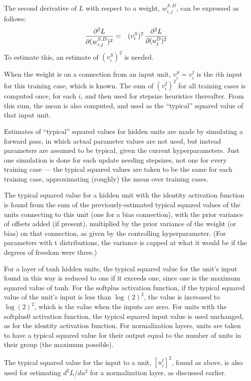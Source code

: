 \documentclass{report}[11pt]
\def\beq{\begin{eqnarray}}
\def\eeq{\end{eqnarray}}
\begin{document}
The second derivative of $L$ with respect to a weight, $w^{S,D}_{i,j}$,
can be expressed as follows:\beq
  {\partial^2 L \over \partial (w^{S,D}_{i,j})^2} & = &
    (v^S_i)^2\,{\partial^2 L \over \partial (u^D_j)^2}
\eeq%
To estimate this, an estimate of $(v^S_i)^2$ is needed.

When the weight is on a connection from an input unit, $v^S_i = v^I_i$
is the $i$th input for this training case, which is known.  The sum of
$(v^I_i)^2$ for all training cases is computed once, for each $i$, and
then used for stepsize heuristics thereafter.  From this sum, the
mean is also computed, and used as the ``typical'' squared value of
that input unit.

Estimates of ``typical'' squared values for hidden units are made by
simulating a forward pass, in which actual parameter values are not
used, but instead parameters are assumed to be typical, given the
current hyperparameters.  Just one simulation is done for each update
needing stepsizes, not one for every training case --- the typical
squared values are taken to be the same for each training case,
approximating (roughly) the mean over training cases.

The typical squared value for a hidden unit with the identity
activation function is found from the sum of the previously-estimated
typical squared values of the units connecting to this unit (one for a
bias connection), with the prior variance of offsets added (if
present), multiplied by the prior variance of the weight (or bias) on
that connection, as given by the controlling hyperparameter.  (For
parameters with t distributions, the variance is capped at what it
would be if the degrees of freedom were three.)

For a layer of tanh hidden units, the typical squared value for the
unit's input found in this way is reduced to one if it exceeds one,
since one is the maximum squared value of tanh.  For the softplus
activation function, if the typical squared value of the unit's input
is less than $\log(2)^2$, the value is increased to $\log(2)^2$, which
is the value when the inputs are zero. For units with the softplus0
activation function, the typical squared input value is used
unchanged, as for the identity activation function.  For normalization
layers, units are taken to have a typical squared value for their
output equal to the number of units in their group (the maximum
possible).

The typical squared value for the input to a unit, $[u^{\ell}_i]^2$,
found as above, is also used for estimating $d^2L/du^2$ for a
normalization layer, as discussed earlier.
\end{document}
